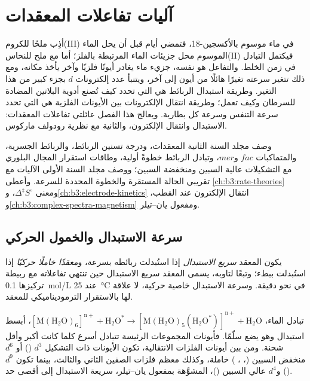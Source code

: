 \chapter{آليات تفاعلات المعقدات}\label{ch:b3:complex-mechanisms}

أذِب ملحًا للكروم(III) في ماء موسوم بالأكسجين-18، فتمضي أيام
قبل أن يحل الماء الموسوم محل جزيئات الماء المرتبطة
بالفلز؛ أما مع ملح للنحاس(II) فيكتمل التبادل في زمن
الخلط. والتفاعل هو نفسه، جزيء ماء يغادر أيونًا فلزيًا 
وآخر يأخذ مكانه، ومع ذلك تتغير سرعته تغيرًا هائلًا من أيون إلى
آخر، ويتنبأ عدد إلكترونات $d$ بجزء كبير من هذا التغير. وطريقة
استبدال الربائط هي التي تحدد كيف تُصنع أدوية البلاتين المضادة للسرطان وكيف
تعمل؛ وطريقة انتقال الإلكترونات بين الأيونات الفلزية هي التي تحدد سرعة
التنفس وسرعة كل بطارية. ويعالج هذا الفصل عائلتي
تفاعلات المعقدات: الاستبدال وانتقال الإلكترون، والثانية مع
نظرية رودولف ماركوس.

\begin{recall}
وصف مجلد السنة الثانية المعقدات، ودرجة تسنين الربائط، والربائط
الجسرية، والمتماكبات $fac$ و$mer$، وتبادل الربائط خطوةً أولية، 
وطاقات استقرار المجال البلوري مع التشكيلات عالية السبين ومنخفضة السبين؛
ووصف مجلد السنة الأولى الآليات مع تقريبي الحالة المستقرة والخطوة المحددة
للسرعة. وأعطى \cref{ch:b3:rate-theories}  
ومعنى $\Delta^{\ddagger}S^\circ$، و\cref{ch:b3:electrode-kinetics} انتقال الإلكترون عند
القطب، و\cref{ch:b3:complex-spectra-magnetism}  
ومفعول يان--تيلر.
\end{recall}

\section{سرعة الاستبدال والخمول الحركي}

\begin{definition}\label{def:b3:complex-mechanisms:labile}
يكون المعقد \emph{سريع الاستبدال} إذا استُبدلت ربائطه
بسرعة، و\emph{معقدًا خاملًا حركيًا}
إذا استُبدلت ببطء؛ وتبعًا لتاوبه، يسمى المعقد سريع الاستبدال حين
تنتهي تفاعلاته مع ربيطة تركيزها \qty{0.1}{mol/L} عند \qty{25}{\celsius} في نحو
دقيقة. وسرعة الاستبدال خاصية حركية، لا علاقة لها بالاستقرار الترموديناميكي
للمعقد.
\end{definition}

تبادل الماء، $\mathrm{[M(H_2O)_6]^{n+} + H_2O^{\ast} \to [M(H_2O)_5(H_2O^{\ast})]^{n+} + H_2O}$، أبسط
استبدال وهو يضع سلّمًا. فأيونات المجموعات الرئيسة تتبادل أسرع كلما
كانت أكبر وأقل شحنة. ومن بين أيونات الفلزات الانتقالية، تكون الأيونات ذات التشكيل $d^3$
() أو $d^6$ منخفض السبين (، ، ) خاملة، وكذلك
معظم فلزات الصفين الثاني والثالث، بينما تكون $d^9$ () و$d^4$ عالي السبين ()،
المشوَّهة بمفعول يان--تيلر، سريعة الاستبدال إلى أقصى حد.

